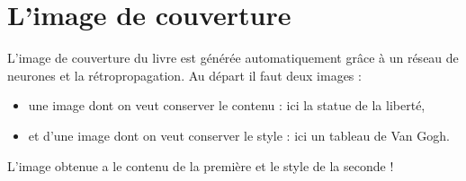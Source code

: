\documentclass[11pt,class=report,crop=false]{standalone}
\begin{document}
\section{L'image de couverture}

L'image de couverture du livre est générée automatiquement grâce à un réseau de neurones et  la rétropropagation. Au départ il faut deux images :
\begin{itemize}
  \item une image dont on veut conserver le contenu :  ici la statue de la liberté,
  \item et d'une image dont on veut conserver le style : ici un tableau de Van Gogh.
\end{itemize}
L'image obtenue a le contenu de la première et le style de la seconde !
\end{document}
